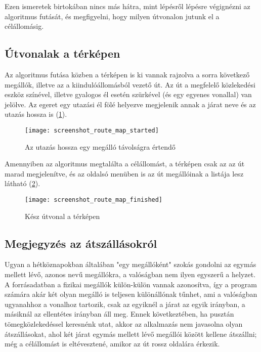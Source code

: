 Ezen ismeretek birtokában nincs más hátra, mint lépésről lépésre végignézni az algoritmus futását, és megfigyelni, hogy milyen útvonalon jutunk el a célállomásig.

\subsection{Útvonalak a térképen}

Az algoritmus futása közben a térképen is ki vannak rajzolva a sorra következő megállók, illetve az a kiindulóállomásból vezető út. Az út a megfelelő közlekedési eszköz színével, illetve gyalogos él esetén szürkével (és egy egyenes vonallal) van jelölve. Az egeret egy utazási él fölé helyezve megjelenik annak a járat neve és az utazás hossza is (\ref{fig:screenshot-route-map-started}).

\begin{figure}[H]
	\centering
	\texttt{[image: screenshot\_route\_map\_started]}
	\caption{Az utazás hossza egy megálló távolságra értendő}
	\label{fig:screenshot-route-map-started}
\end{figure}

Amennyiben az algoritmus megtalálta a célállomást, a térképen csak az az út marad megjelenítve, és az oldalsó menüben is az út megállóinak a listája lesz látható (\ref{fig:screenshot-route-map-finished}).

\begin{figure}[H]
	\centering
	\texttt{[image: screenshot\_route\_map\_finished]}
	\caption{Kész útvonal a térképen}
	\label{fig:screenshot-route-map-finished}
\end{figure}

\subsection{Megjegyzés az átszállásokról}

Ugyan a hétköznapokban általában "egy megállóként" szokás gondolni az egymás mellett lévő, azonos nevű megállókra, a valóságban nem ilyen egyszerű a helyzet. A forrásadatban a fizikai megállók külön-külön vannak azonosítva, így a program számára akár két olyan megálló is teljesen különállónak tűnhet, ami a valóságban ugyanahhoz a vonalhoz tartozik, csak az egyiknél a járat az egyik irányban, a másiknál az ellentétes irányban áll meg. Ennek következtében, ha pusztán tömegközlekedéssel keresnénk utat, akkor az alkalmazás nem javasolna olyan átszállásokat, ahol két járat egymás mellett lévő megállói között kellene átszállni; még a célállomást is eltévesztené, amikor az út rossz oldalára érkezik.

